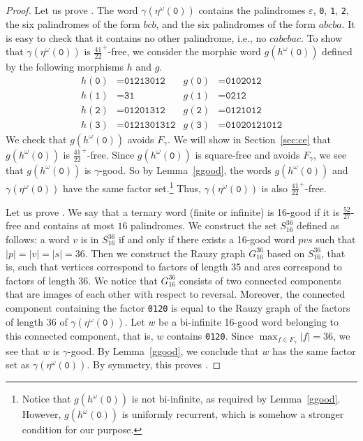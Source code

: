 \documentclass[10pt,a4paper]{amsart}
\begin{document}
\begin{proof}
Let us prove .  The word
$\gamma(\eta^\omega(\texttt{0}))$ contains the palindromes $\varepsilon$, \texttt{0}, \texttt{1}, \texttt{2}, the six palindromes
of the form $bcb$, and the six palindromes of the form $abcba$. It is easy to check that it contains no other palindrome, i.e., no $cabcbac$.
To show that $\gamma(\eta^\omega(\texttt{0}))$ is $\tfrac{41}{22}^+$-free, we consider the morphic word
$g(h^\omega(\texttt{0}))$ defined by the following morphisms $h$ and $g$.
\begin{align*}
    h(\texttt{0}) &= \texttt{01213012} & g(\texttt{0}) &= \texttt{0102012}\\
    h(\texttt{1}) &= \texttt{31} & g(\texttt{1}) &= \texttt{0212}\\
    h(\texttt{2}) &= \texttt{01201312} & g(\texttt{2}) &= \texttt{0121012}\\
    h(\texttt{3}) &= \texttt{0121301312} & g(\texttt{3}) &= \texttt{01020121012}
\end{align*}
We check that $g(h^\omega(\texttt{0}))$ avoids $F_\gamma$. We will show in Section~\ref{sec:ce} that $g(h^\omega(\texttt{0}))$ is $\tfrac{41}{22}^+$-free.
Since $g(h^\omega(\texttt{0}))$ is square-free and avoids $F_\gamma$, we see that $g(h^\omega(\texttt{0}))$ is $\gamma$-good. So by Lemma~\ref{ggood}, the words
$g(h^\omega(\texttt{0}))$ and $\gamma(\eta^\omega(\texttt{0}))$ have the same factor set.\footnote{Notice that $g(h^\omega(\texttt{0}))$ is not bi-infinite,
as required by Lemma~\ref{ggood}. However, $g(h^\omega(\texttt{0}))$ is uniformly recurrent, which is somehow a stronger condition for our purpose.}
Thus, $\gamma(\eta^\omega(\texttt{0}))$ is also $\tfrac{41}{22}^+$-free.

Let us prove .
We say that a ternary word (finite or infinite) is 16-good if it is $\tfrac{52}{27}$-free and contains at most $16$ palindromes.
We construct the set $S_{16}^{36}$ defined as follows:
a word $v$ is in $S_{16}^{36}$ if and only if there exists a 16-good word $pvs$ such that $|p|=|v|=|s|=36$.
Then we construct the Rauzy graph $G_{16}^{36}$ based on $S_{16}^{36}$, that is, such that vertices correspond to factors of length 35 and arcs correspond to factors of length 36.
We notice that $G_{16}^{36}$ consists of two connected components that are images of each other with respect to reversal.
Moreover, the connected component containing the factor \texttt{0120} is equal to the Rauzy graph
of the factors of length 36 of $\gamma(\eta^\omega(\texttt{0}))$.
Let $w$ be a bi-infinite 16-good word belonging to this connected component, that is, $w$ contains \texttt{0120}.
Since $\max_{f\in F_\gamma}|f|=36$, we see that $w$ is $\gamma$-good. By Lemma~\ref{ggood}, we conclude that $w$ has the same factor set as $\gamma(\eta^\omega(\texttt{0}))$.
By symmetry, this proves .


\end{proof}
\end{document}
